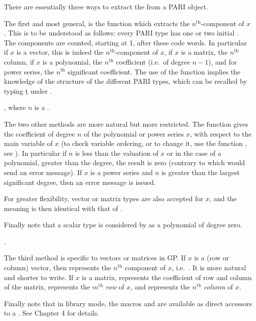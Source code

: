 There are essentially three ways to extract the  from a PARI
object.

The first and most general, is the function  which
extracts the $n^{\text{th}}$-component of $x$. This is to be understood as
follows: every PARI type has one or two initial . The
components are counted, starting at 1, after these code words. In particular
if $x$ is a vector, this is indeed the $n^{\text{th}}$-component of $x$, if
$x$ is a matrix, the $n^{\text{th}}$ column, if $x$ is a polynomial, the
$n^{\text{th}}$ coefficient (i.e.~of degree $n-1$), and for power series, the
$n^{\text{th}}$ significant coefficient. The use of the function
 implies the knowledge of the structure of the different PARI
types, which can be recalled by typing \b{t} under .

, where $n$ is a .

The two other methods are more natural but more restricted. The function
 gives the coefficient of degree $n$ of the polynomial
or power series $x$, with respect to the main variable of $x$ (to check
variable ordering, or to change it, use the function , see
). In particular if $n$ is less than the valuation of
$x$ or in the case of a polynomial, greater than the degree, the result is
zero (contrary to  which would send an error message). If $x$ is
a power series and $n$ is greater than the largest significant degree, then
an error message is issued.

For greater flexibility, vector or matrix types are also accepted for $x$,
and the meaning is then identical with that of .

Finally note that a scalar type is considered by  as a
polynomial of degree zero.

.

The third method is specific to vectors or matrices in GP. If $x$ is a
(row or column) vector, then  represents the $n^{\text{th}}$
component of $x$, i.e.~. It is more natural and shorter to
write. If $x$ is a matrix,  represents the coefficient of
row  and column  of the matrix,  represents
the $m^{\text{th}}$ \emph{row} of $x$, and  represents
the $n^{\text{th}}$ \emph{column} of $x$.

Finally note that in library mode, the macros  and 
are available as direct accessors to a . See Chapter 4 for
details.

